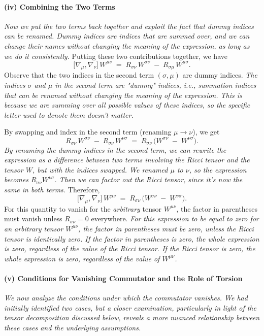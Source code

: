 \documentclass{article}
\begin{document}
\paragraph{(iv) Combining the Two Terms}
\textit{Now we put the two terms back together and exploit the fact that dummy indices can be renamed. Dummy indices are indices that are summed over, and we can change their names without changing the meaning of the expression, as long as we do it consistently.}
Putting these two contributions together, we have
\[
\bigl[\nabla_{\mu}, \nabla_{\nu}\bigr]\,W^{\mu\nu}
\;=\;
R_{\sigma\nu}\,W^{\sigma\nu}
\;-\;
R_{\sigma\mu}\,W^{\mu\sigma}.
\]
Observe that the two indices in the second term $(\sigma,\mu)$ are dummy indices.
\textit{The indices \(\sigma\) and \(\mu\) in the second term are "dummy" indices, i.e., summation indices that can be renamed without changing the meaning of the expression. This is because we are summing over all possible values of these indices, so the specific letter used to denote them doesn't matter.}

By swapping and index in the second term (renaming $\mu\to\nu$), we get
\[
R_{\sigma\nu}\,W^{\sigma\nu}
\;-\;
R_{\sigma\nu}\,W^{\nu\sigma}
\;=\;
R_{\sigma\nu}\,
\bigl(W^{\sigma\nu} \;-\; W^{\nu\sigma}\bigr).
\]
\textit{By renaming the dummy indices in the second term, we can rewrite the expression as a difference between two terms involving the Ricci tensor and the tensor \(W\), but with the indices swapped. We renamed \(\mu\) to \(\nu\), so the expression becomes \(R_{\sigma\nu}W^{\nu\sigma}\). Then we can factor out the Ricci tensor, since it's now the same in both terms.}
Therefore,
\[
\bigl[\nabla_{\mu}, \nabla_{\nu}\bigr]\,W^{\mu\nu} \;=\; 
R_{\sigma\nu}\,\bigl(W^{\sigma\nu} \;-\; W^{\nu\sigma}\bigr).
\]
For this quantity to vanish for the \emph{arbitrary} tensor $W^{\mu\nu}$, the factor in parentheses must vanish unless $R_{\sigma\nu}=0$ everywhere.
\textit{For this expression to be equal to zero for an arbitrary tensor \(W^{\mu\nu}\), the factor in parentheses must be zero, unless the Ricci tensor is identically zero. If the factor in parentheses is zero, the whole expression is zero, regardless of the value of the Ricci tensor. If the Ricci tensor is zero, the whole expression is zero, regardless of the value of \(W^{\mu\nu}\).}

\paragraph{(v) Conditions for Vanishing Commutator and the Role of Torsion}
\textit{We now analyze the conditions under which the commutator vanishes. We had initially identified two cases, but a closer examination, particularly in light of the tensor decomposition discussed below, reveals a more nuanced relationship between these cases and the underlying assumptions.}
\end{document}
